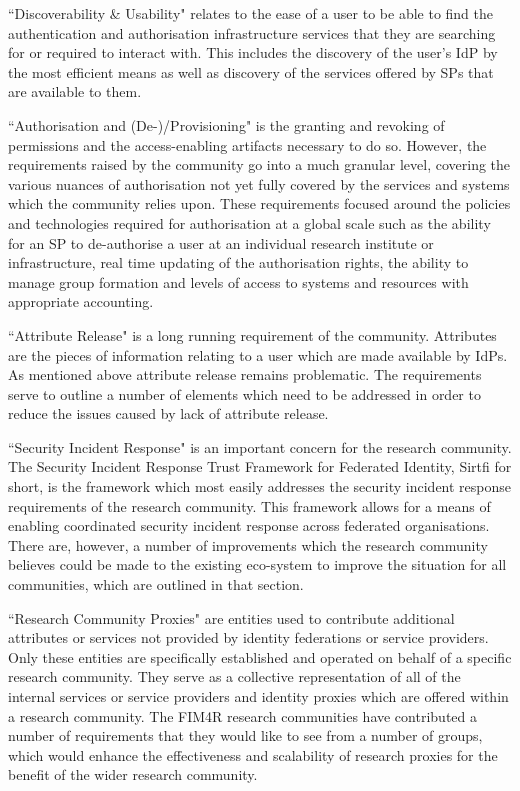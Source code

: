 \documentclass[fleqn,10pt]{wlscirep}
\begin{document}
{``Discoverability \& Usability" relates to the ease of a user to be able to find the authentication and authorisation infrastructure services that they are searching for or required to interact with.  This includes the discovery of the user’s IdP by the most efficient means as well as discovery of the services offered by SPs that are available to them. 

``Authorisation and (De-)/Provisioning" is the granting and revoking of permissions and the access-enabling artifacts necessary to do so.  However, the requirements raised by the community go into a much granular level, covering the various nuances of authorisation not yet fully covered by the services and systems which the community relies upon.  These requirements focused around the policies and technologies required for authorisation at a global scale such as the ability for an SP to de-authorise a user at an individual research institute or infrastructure, real time updating of the authorisation rights, the ability to manage group formation and levels of access to systems and resources with appropriate accounting.     

``Attribute Release" is a long running requirement of the community.  Attributes are the pieces of information relating to a user which are made available by IdPs.  As mentioned above attribute release remains problematic. The requirements serve to outline a number of elements which need to be addressed in order to reduce the issues caused by lack of attribute release.  

``Security Incident Response" is an important concern for the research community.  The Security Incident Response Trust Framework for Federated Identity, Sirtfi for short, is the framework which most easily addresses the security incident response requirements of the research community.  This framework allows for a means of enabling coordinated security incident response across federated organisations. There are, however, a number of improvements which the research community believes could be made to the existing eco-system to improve the situation for all communities, which are outlined in that section.

``Research Community Proxies" are entities used to contribute additional attributes or services not provided by identity federations or service providers.  Only these entities are specifically established and operated on behalf of a specific research community.  They serve as a collective representation of all of the internal services or service providers and identity proxies which are offered within a research community. The FIM4R research communities have contributed a number of requirements that they would like to see from a number of groups, which would enhance the effectiveness and scalability of research proxies for the benefit of the wider research community. 

}
\end{document}
